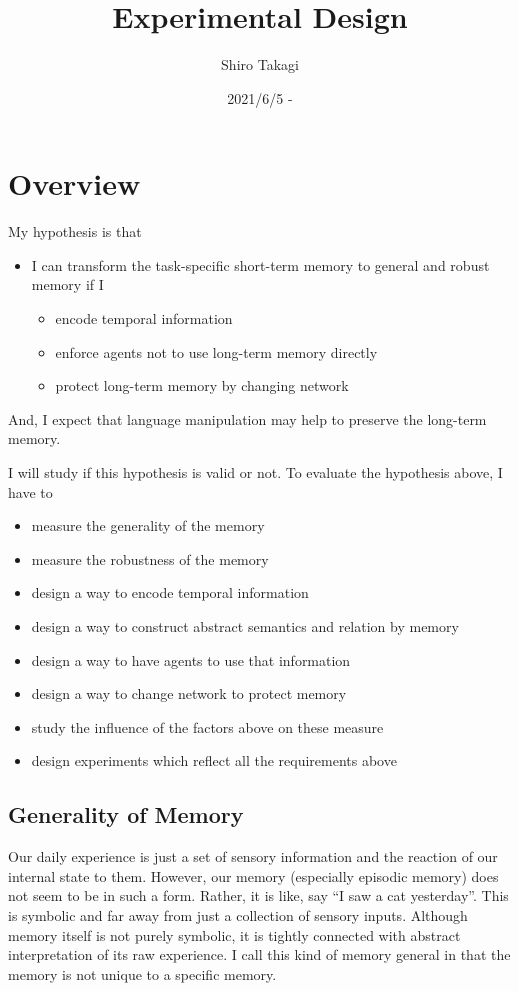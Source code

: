 \documentclass[12pt]{article}
\begin{document}
\title{Experimental Design}
\author{Shiro Takagi}
\date{2021/6/5 -}
\maketitle

\section{Overview}
My hypothesis is that
\begin{itemize}
    \item I can transform the task-specific short-term memory to general and robust memory if I
    \begin{itemize}
        \item encode temporal information
        \item enforce agents not to use long-term memory directly
        \item protect long-term memory by changing network
    \end{itemize}
\end{itemize}
And, I expect that language manipulation may help to preserve the long-term memory.

I will study if this hypothesis is valid or not. To evaluate the hypothesis above, I have to 
\begin{itemize}
    \item measure the generality of the memory
    \item measure the robustness of the memory
    \item design a way to encode temporal information
    \item design a way to construct abstract semantics and relation by memory
    \item design a way to have agents to use that information
    \item design a way to change network to protect memory
    \item study the influence of the factors above on these measure
    \item design experiments which reflect all the requirements above
\end{itemize}

\subsection{Generality of Memory}
Our daily experience is just a set of sensory information and the reaction of our internal state to them. 
However, our memory (especially episodic memory) does not seem to be in such a form. Rather, it is like, say 
``I saw a cat yesterday''. This is symbolic and far away from just a collection of sensory inputs. Although 
memory itself is not purely symbolic, it is tightly connected with abstract interpretation of its raw experience.
I call this kind of memory general in that the memory is not unique to a specific memory.
\end{document}
